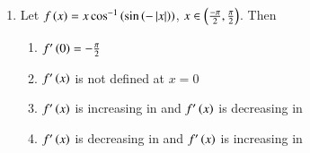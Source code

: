 \documentclass[journal,12pt,onecolumn]{IEEEtran}
\theoremstyle{remark}
\begin{document}
\begin{enumerate}
\hfill{}
\begin{enumerate}
\end{enumerate}

\item Let $f\left(x\right) = x\cos^{-1}\left(\sin\left(-\left\vert x\right\vert\right)\right)$, $x \in \left(\frac{-\pi}{2},\frac{\pi}{2}\right)$. Then

\hfill{}
\begin{enumerate}
\item $f^\prime\left(0\right)=-\frac{\pi}{2}$
\item $f^\prime\left(x\right)$ is not defined at $x=0$
\item $f^\prime\left(x\right)$ is increasing in  and $f^\prime\left(x\right)$ is decreasing in 
\item $f^\prime\left(x\right)$ is decreasing in  and $f^\prime\left(x\right)$ is increasing in 
\end{enumerate}

\end{enumerate}
\end{document}
